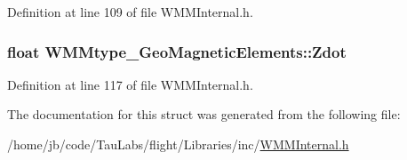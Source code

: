 \-Definition at line 109 of file \-W\-M\-M\-Internal.\-h.

\hypertarget{struct_w_m_mtype___geo_magnetic_elements_a094afb05e04f6d9654a1a469987600a6}{
\subsubsection[{\-Zdot}]{\setlength{\rightskip}{0pt plus 5cm}float {\bf \-W\-M\-Mtype\-\_\-\-Geo\-Magnetic\-Elements\-::\-Zdot}}}\label{struct_w_m_mtype___geo_magnetic_elements_a094afb05e04f6d9654a1a469987600a6}


\-Definition at line 117 of file \-W\-M\-M\-Internal.\-h.



\-The documentation for this struct was generated from the following file\-:\begin{DoxyCompactItemize}
\item 
/home/jb/code/\-Tau\-Labs/flight/\-Libraries/inc/\hyperlink{_w_m_m_internal_8h}{\-W\-M\-M\-Internal.\-h}\end{DoxyCompactItemize}
